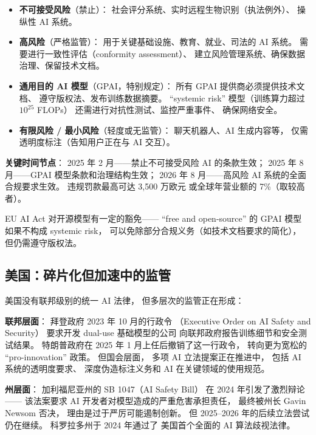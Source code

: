 \begin{itemize}[noitemsep]
  \item \textbf{不可接受风险}（禁止）：
        社会评分系统、实时远程生物识别（执法例外）、
        操纵性 AI 系统。
  \item \textbf{高风险}（严格监管）：
        用于关键基础设施、教育、就业、司法的 AI 系统。
        需要进行一致性评估（conformity assessment）、
        建立风险管理系统、确保数据治理、保留技术文档。
  \item \textbf{通用目的 AI 模型}（GPAI，特别规定）：
        所有 GPAI 提供商必须提供技术文档、
        遵守版权法、发布训练数据摘要。
        ``systemic risk'' 模型（训练算力超过 $10^{25}$ FLOPs）
        还需进行对抗性测试、监控严重事件、
        确保网络安全。
  \item \textbf{有限风险 / 最小风险}（轻度或无监管）：
        聊天机器人、AI 生成内容等，
        仅需透明度标注（告知用户正在与 AI 交互）。
\end{itemize}

\textbf{关键时间节点}：
2025 年 2 月——禁止不可接受风险 AI 的条款生效；
2025 年 8 月——GPAI 模型条款和治理结构生效；
2026 年 8 月——高风险 AI 系统的全面合规要求生效。
违规罚款最高可达 3,500 万欧元
或全球年营业额的 7\%（取较高者）。

EU AI Act 对开源模型有一定的豁免——
``free and open-source'' 的 GPAI 模型
如果不构成 systemic risk，
可以免除部分合规义务（如技术文档要求的简化），
但仍需遵守版权法。

\subsection{美国：碎片化但加速中的监管}

美国没有联邦级别的统一 AI 法律，
但多层次的监管正在形成：

\textbf{联邦层面}：
拜登政府 2023 年 10 月的行政令
（Executive Order on AI Safety and Security）
要求开发 dual-use 基础模型的公司
向联邦政府报告训练细节和安全测试结果。
特朗普政府在 2025 年 1 月上任后撤销了这一行政令，
转向更为宽松的 ``pro-innovation'' 政策。
但国会层面，
多项 AI 立法提案正在推进中，
包括 AI 系统的透明度要求、
深度伪造标注义务和 AI 在关键领域的使用规范。

\textbf{州层面}：
加利福尼亚州的 SB 1047（AI Safety Bill）
在 2024 年引发了激烈辩论——
该法案要求 AI 开发者对模型造成的严重危害承担责任，
最终被州长 Gavin Newsom 否决，
理由是过于严厉可能遏制创新。
但 2025--2026 年的后续立法尝试仍在继续。
科罗拉多州于 2024 年通过了
美国首个全面的 AI 算法歧视法律。

